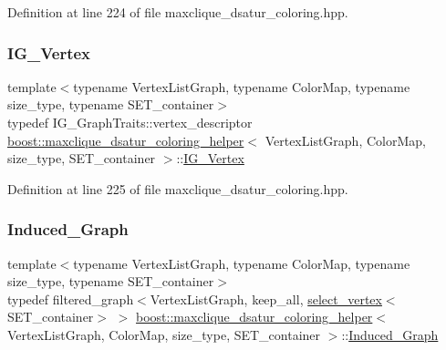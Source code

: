 Definition at line 224 of file maxclique\+\_\+dsatur\+\_\+coloring.\+hpp.

\mbox{\label{classboost_1_1maxclique__dsatur__coloring__helper_aaedfd2b04cb4322182812033fcc9f879}} 
\subsubsection{\texorpdfstring{I\+G\+\_\+\+Vertex}{IG\_Vertex}}
{\footnotesize\ttfamily template$<$typename Vertex\+List\+Graph, typename Color\+Map, typename size\+\_\+type, typename S\+E\+T\+\_\+container$>$ \\
typedef I\+G\+\_\+\+Graph\+Traits\+::vertex\+\_\+descriptor \hyperlink{classboost_1_1maxclique__dsatur__coloring__helper}{boost\+::maxclique\+\_\+dsatur\+\_\+coloring\+\_\+helper}$<$ Vertex\+List\+Graph, Color\+Map, size\+\_\+type, S\+E\+T\+\_\+container $>$\+::\hyperlink{classboost_1_1maxclique__dsatur__coloring__helper_aaedfd2b04cb4322182812033fcc9f879}{I\+G\+\_\+\+Vertex}\hspace{0.3cm}{\ttfamily [private]}}



Definition at line 225 of file maxclique\+\_\+dsatur\+\_\+coloring.\+hpp.

\mbox{\label{classboost_1_1maxclique__dsatur__coloring__helper_a2928978558b9545fe58e467dd8adf0e5}} 
\subsubsection{\texorpdfstring{Induced\+\_\+\+Graph}{Induced\_Graph}}
{\footnotesize\ttfamily template$<$typename Vertex\+List\+Graph, typename Color\+Map, typename size\+\_\+type, typename S\+E\+T\+\_\+container$>$ \\
typedef filtered\+\_\+graph$<$Vertex\+List\+Graph, keep\+\_\+all, \hyperlink{structboost_1_1select__vertex}{select\+\_\+vertex}$<$S\+E\+T\+\_\+container$>$ $>$ \hyperlink{classboost_1_1maxclique__dsatur__coloring__helper}{boost\+::maxclique\+\_\+dsatur\+\_\+coloring\+\_\+helper}$<$ Vertex\+List\+Graph, Color\+Map, size\+\_\+type, S\+E\+T\+\_\+container $>$\+::\hyperlink{classboost_1_1maxclique__dsatur__coloring__helper_a2928978558b9545fe58e467dd8adf0e5}{Induced\+\_\+\+Graph}\hspace{0.3cm}{\ttfamily [private]}}



